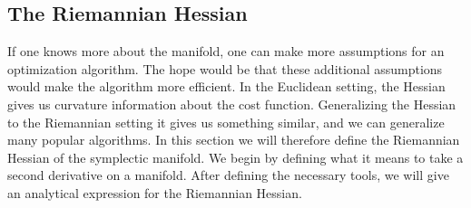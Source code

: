 \subsection{The Riemannian Hessian}\label{sec:riemannian_hessian}
If one knows more about the manifold, one can make more assumptions for an optimization algorithm. The hope would be that these additional assumptions would make the algorithm more efficient. In the Euclidean setting, the Hessian gives us curvature information about the cost function. Generalizing the Hessian to the Riemannian setting it gives us something similar, and we can generalize many popular algorithms. In this section we will therefore define the Riemannian Hessian of the symplectic manifold. We begin by defining what it means to take a second derivative on a manifold. After defining the necessary tools, we will give an analytical expression for the Riemannian Hessian. 

